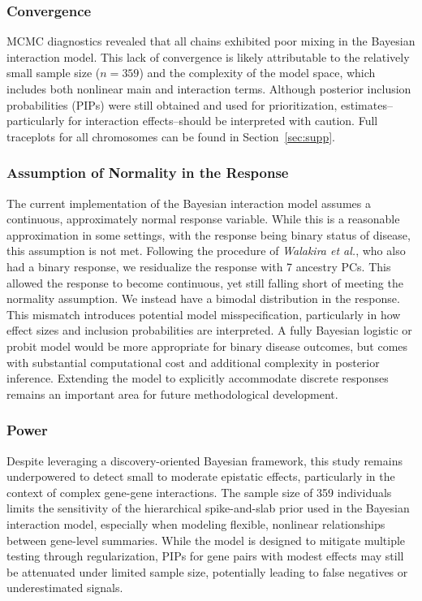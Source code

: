 \documentclass{article}\usepackage[]{graphicx}\usepackage[]{color}
\begin{document}
\subsubsection{Convergence}
MCMC diagnostics revealed that all chains exhibited poor mixing in the Bayesian interaction model. This lack of convergence is likely attributable to the relatively small sample size ($n = 359$) and the complexity of the model space, which includes both nonlinear main and interaction terms. Although posterior inclusion probabilities (PIPs) were still obtained and used for prioritization, estimates--particularly for interaction effects--should be interpreted with caution. Full traceplots for all chromosomes can be found in Section~\ref{sec:supp}.

\subsubsection{Assumption of Normality in the Response}
The current implementation of the Bayesian interaction model assumes a continuous, approximately normal response variable. While this is a reasonable approximation in some settings, with the response being binary status of disease, this assumption is not met. Following the procedure of \textit{Walakira et al.}\cite{walakiraDetectingGeneGene2022}, who also had a binary response, we residualize the response with 7 ancestry PCs. This allowed the response to become continuous, yet still falling short of meeting the normality assumption. We instead have a bimodal distribution in the response. This mismatch introduces potential model misspecification, particularly in how effect sizes and inclusion probabilities are interpreted. A fully Bayesian logistic or probit model would be more appropriate for binary disease outcomes, but comes with substantial computational cost and additional complexity in posterior inference. Extending the model to explicitly accommodate discrete responses remains an important area for future methodological development.

\subsubsection{Power}
Despite leveraging a discovery-oriented Bayesian framework, this study remains underpowered to detect small to moderate epistatic effects, particularly in the context of complex gene-gene interactions. The sample size of 359 individuals limits the sensitivity of the hierarchical spike-and-slab prior used in the Bayesian interaction model, especially when modeling flexible, nonlinear relationships between gene-level summaries. While the model is designed to mitigate multiple testing through regularization, PIPs for gene pairs with modest effects may still be attenuated under limited sample size, potentially leading to false negatives or underestimated signals.
\end{document}
